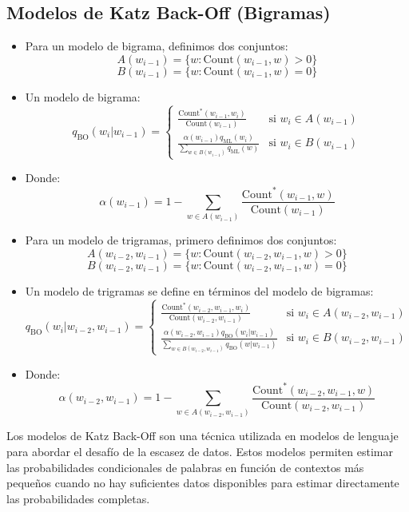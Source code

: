\subsection{Modelos de Katz Back-Off (Bigramas)}
\begin{itemize}
    \item Para un modelo de bigrama, definimos dos conjuntos:
    \[
    A(w_{i-1}) = \{w : \text{Count}(w_{i-1}, w) > 0\}
    \]
    \[
    B(w_{i-1}) = \{w : \text{Count}(w_{i-1}, w) = 0\}
    \]
    \item Un modelo de bigrama:
    \[
    q_{\text{BO}}(w_i | w_{i-1}) =
    \begin{cases}
        \frac{\text{Count}^*(w_{i-1}, w_i)}{\text{Count}(w_{i-1})} & \text{si } w_i \in A(w_{i-1}) \\
        \frac{\alpha(w_{i-1}) q_{\text{ML}}(w_i)}{\sum_{w \in B(w_{i-1})} q_{\text{ML}}(w)} & \text{si } w_i \in B(w_{i-1})
    \end{cases}
    \]
    \item Donde:
    \[
    \alpha(w_{i-1}) = 1 - \sum_{w \in A(w_{i-1})} \frac{\text{Count}^*(w_{i-1}, w)}{\text{Count}(w_{i-1})}
    \]
    \item Para un modelo de trigramas, primero definimos dos conjuntos:
    \[
    A(w_{i-2}, w_{i-1}) = \{w : \text{Count}(w_{i-2}, w_{i-1}, w) > 0\}
    \]
    \[
    B(w_{i-2}, w_{i-1}) = \{w : \text{Count}(w_{i-2}, w_{i-1}, w) = 0\}
    \]
    \item Un modelo de trigramas se define en términos del modelo de bigramas:
    \[
    q_{\text{BO}}(w_i | w_{i-2}, w_{i-1}) =
    \begin{cases}
        \frac{\text{Count}^*(w_{i-2}, w_{i-1}, w_i)}{\text{Count}(w_{i-2}, w_{i-1})} & \text{si } w_i \in A(w_{i-2}, w_{i-1}) \\
        \frac{\alpha(w_{i-2}, w_{i-1}) q_{\text{BO}}(w_i|w_{i-1})}{\sum_{w \in B(w_{i-2}, w_{i-1})} q_{\text{BO}}(w|w_{i-1})} & \text{si } w_i \in B(w_{i-2}, w_{i-1})
    \end{cases}
    \]
    \item Donde:
    \[
    \alpha(w_{i-2}, w_{i-1}) = 1 - \sum_{w \in A(w_{i-2}, w_{i-1})} \frac{\text{Count}^*(w_{i-2}, w_{i-1}, w)}{\text{Count}(w_{i-2}, w_{i-1})}
    \]
\end{itemize}


Los modelos de Katz Back-Off son una técnica utilizada en modelos de lenguaje para abordar el desafío de la escasez de datos. Estos modelos permiten estimar las probabilidades condicionales de palabras en función de contextos más pequeños cuando no hay suficientes datos disponibles para estimar directamente las probabilidades completas.

